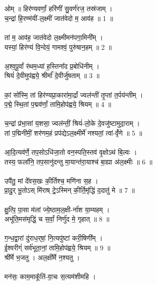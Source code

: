 \section{}
ओम् ॥ हिर॑ण्यवर्णां॒ हरि॑णीं सु॒वर्ण॑रज॒ तस्र॑जाम् ।\\
च॒न्द्रां हि॒रण्म॑यीं-ल॒क्ष्मीं जात॑वेदो म॒ आव॑ह ॥ 1 ॥\\
\\
तां म॒ आव॑ह॒ जात॑वेदो ल॒क्ष्मीमन॑पगा॒मिनी᳚म् ।\\
यस्यां॒ हिर॑ण्यं वि॒न्देयं॒ गामश्वं॒ पुरु॑षान॒हम् ॥ 2 ॥\\
\\
अ॒श्व॒पू॒र्वां र॑थम॒ध्यां ह॒स्तिना᳚द प्र॒बोधि॑नीम् ।\\
श्रियं॑ दे॒वीमुप॑ह्वये॒ श्रीर्मा᳚  दे॒वीर्जु॑षताम् ॥ 3 ॥\\
\\
कां॒ सो॑स्मि॒ तां हिर॑ण्यप्रा॒कारा॑मा॒र्द्रां ज्वल॑न्तीं तृ॒प्तां त॒र्पय॑न्तीम् ।\\
प॒द्मे॒ स्थि॒तां प॒द्मव॑र्णां॒ तामि॒होप॑ह्वये॒ श्रियम् ॥ 4 ॥\\
\\
च॒न्द्रां प्र॑भा॒सां य॒शसा॒ ज्वल॑न्तीं॒ श्रियं॑-लो॒के दे॒वजु॑ष्टामुदा॒राम् ।\\
तां प॒द्मिनी॑मीं॒ शर॑णम॒हं प्रप॑द्येऽल॒क्ष्मीर्मे॑ नश्यतां॒ त्वां-वृँ॑णे ॥ 5 ॥\\
\\
आ॒दि॒त्यव॑र्णे॒ तप॒सोऽधि॑जा॒तो वन॒स्पति॒स्तव॑ वृ॒क्षोऽथ॑ बि॒ल्वः ।\\
तस्य॒ फला᳚नि॒ तप॒सानु॑दन्तु मा॒यान्त॑रा॒याश्च॑ बा॒ह्या अ॑ल॒क्ष्मीः ॥ 6 ॥\\
\\
उपै॑तु॒ मां दे᳚वस॒खः की॒र्तिश्च॒ मणि॑ना स॒ह ।\\
प्रा॒दु॒र् भू॒तोऽस् मि॑राष् ट्रे॒ऽस्मिन् की॒र्ति॒मृ॑द्धिं द॒दातु॑ मे ॥ 7 ॥\\
\\
क्षु॒त्पि॒ पा॒सा म॑लां ज्ये॒ष्ठाम॒ल॒क्षी-र्ना॑श या॒म्यहम् ।\\
अभू॑ति॒मस॑मृद्धिं॒ च स॒र्वां॒ निर्णु॑द मे॒ गृहात् ॥ 8 ॥\\
\\
ग॒न्ध॒द्वा॒रां दु॑राध॒र्​षां॒ नि॒त्यपु॑ष्टां करी॒षिणी᳚म् ।\\
ई॒श्वरीग्ं॑ सर्व॑भूता॒नां॒ तामि॒होप॑ह्वये॒ श्रियम् ॥ 9 ॥\\
{\small श्री᳚र्मे भ॒जतु । अल॒क्षी᳚र्मे न॒श्यतु ।}\\
\\
मन॑सः॒ काम॒माकू᳚तिं-वा॒चः स॒त्यम॑शीमहि ।\\
